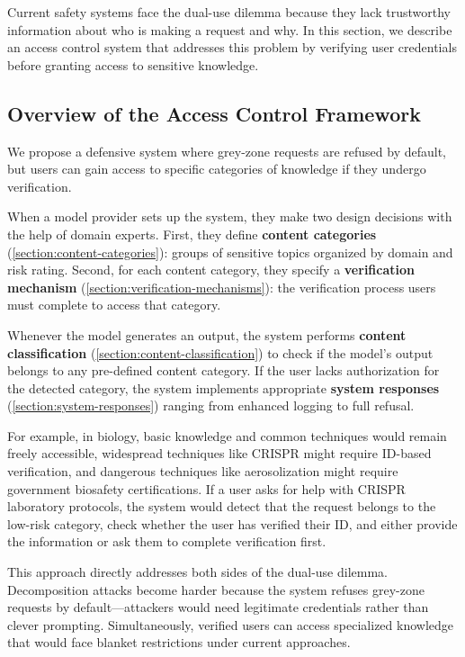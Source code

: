 \documentclass{article}
\theoremstyle{plain}
\theoremstyle{definition}
\theoremstyle{remark}
\begin{document}
Current safety systems face the dual-use dilemma because they lack trustworthy information about who is making a request and why.
In this section, we describe an access control system that addresses this problem by verifying user credentials before granting access to sensitive knowledge.

\subsection{Overview of the Access Control Framework}

We propose a defensive system where grey-zone requests are refused by default, but users can gain access to specific categories of knowledge if they undergo verification.

When a model provider sets up the system, they make two design decisions with the help of domain experts.
First, they define \textbf{content categories} (\cref{section:content-categories}): groups of sensitive topics organized by domain and risk rating.
Second, for each content category, they specify a \textbf{verification mechanism} (\cref{section:verification-mechanisms}): the verification process users must complete to access that category.

Whenever the model generates an output, the system performs \textbf{content classification} (\cref{section:content-classification}) to check if the model's output belongs to any pre-defined content category.
If the user lacks authorization for the detected category, the system implements appropriate \textbf{system responses} (\cref{section:system-responses}) ranging from enhanced logging to full refusal.

For example, in biology, basic knowledge and common techniques would remain freely accessible, widespread techniques like CRISPR might require ID-based verification, and dangerous techniques like aerosolization might require government biosafety certifications.
If a user asks for help with CRISPR laboratory protocols, the system would detect that the request belongs to the low-risk category, check whether the user has verified their ID, and either provide the information or ask them to complete verification first.

This approach directly addresses both sides of the dual-use dilemma.
Decomposition attacks become harder because the system refuses grey-zone requests by default---attackers would need legitimate credentials rather than clever prompting.
Simultaneously, verified users can access specialized knowledge that would face blanket restrictions under current approaches.
\end{document}
